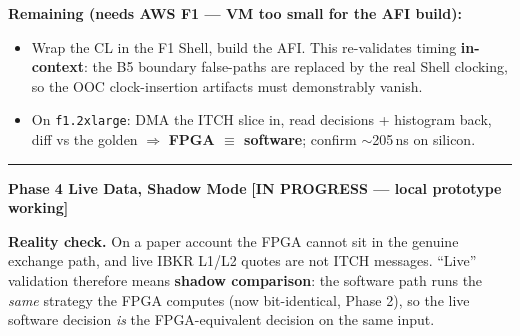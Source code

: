 \documentclass[10pt,a4paper]{article}
\newcommand{\sectionrule}{\vspace{2pt}\textcolor{rulegray}{\rule{\linewidth}{0.8pt}}\vspace{2pt}}
\begin{document}
\textbf{Remaining (needs AWS F1 — VM too small for the AFI build):}
\begin{itemize}[leftmargin=1.4em, itemsep=2pt]
  \item Wrap the CL in the F1 Shell, build the AFI. This re-validates timing
        \textbf{in-context}: the B5 boundary false-paths are replaced by the real
        Shell clocking, so the OOC clock-insertion artifacts must demonstrably
        vanish.
  \item On \texttt{f1.2xlarge}: DMA the ITCH slice in, read decisions + histogram
        back, diff vs the golden $\Rightarrow$ \textbf{FPGA $\equiv$ software};
        confirm $\sim$205\,ns on silicon.
\end{itemize}

\sectionrule

{\large\bfseries\color{hdrblue} Phase 4 \textendash{} Live Data, Shadow Mode\quad}%
{\large\color{warnamber}\textbf{[IN PROGRESS — local prototype working]}}

\textbf{Reality check.} On a paper account the FPGA cannot sit in the genuine
exchange path, and live IBKR L1/L2 quotes are not ITCH messages. ``Live''
validation therefore means \textbf{shadow comparison}: the software path runs the
\emph{same} strategy the FPGA computes (now bit-identical, Phase 2), so the live
software decision \emph{is} the FPGA-equivalent decision on the same input.
\end{document}
